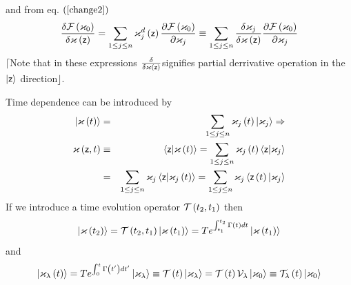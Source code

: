 and from eq. $\left( \ref{change2}\right) $%
\begin{equation}
\frac{\delta {\cal F}\left( \varkappa _{0}\right) }{\delta \varkappa \left( 
{\sf z}\right) }=\sum_{1\leq j\leq n}\varkappa _{j}^{d}\left( {\sf z}\right) 
\frac{\partial {\cal F}\left( \varkappa _{0}\right) }{\partial \varkappa _{j}%
}\equiv \sum_{1\leq j\leq n}\frac{\delta \varkappa _{j}}{\delta \varkappa
\left( {\sf z}\right) }\frac{\partial {\cal F}\left( \varkappa _{0}\right) }{%
\partial \varkappa _{j}}
\end{equation}%
$\lceil $Note that in these expressions $\frac{\delta }{\delta \varkappa
\left( {\sf z}\right) }$signifies partial derrivative operation in the $%
\left| {\sf z}\right\rangle $ direction$\rfloor $.

Time dependence can be introduced by 
\begin{eqnarray}
\left| {\bf \varkappa }\left( t\right) \right\rangle &=&\sum_{1\leq j\leq
n}\varkappa _{j}\left( t\right) \left| {\bf \varkappa }_{j}\right\rangle
\Rightarrow \\
\varkappa \left( {\sf z},t\right) &\equiv &\left\langle {\sf z}|{\bf %
\varkappa }\left( t\right) \right\rangle =\sum_{1\leq j\leq n}\varkappa
_{j}\left( t\right) \left\langle {\sf z}|{\bf \varkappa }_{j}\right\rangle \\
&=&\sum_{1\leq j\leq n}\varkappa _{j}\left\langle {\sf z}|{\bf \varkappa }%
_{j}\left( t\right) \right\rangle =\sum_{1\leq j\leq n}\varkappa
_{j}\left\langle {\sf z}\left( t\right) |{\bf \varkappa }_{j}\right\rangle
\end{eqnarray}%
If we introduce a time evolution operator ${\cal T}\left( t_{2},t_{1}\right) 
$ then%
\begin{equation}
\left| {\bf \varkappa }\left( t_{2}\right) \right\rangle ={\cal T}\left(
t_{2},t_{1}\right) \left| {\bf \varkappa }\left( t_{1}\right) \right\rangle
=Te^{\int_{t_{1}}^{t_{2}}\Gamma \left( t\right) dt}\left| {\bf \varkappa }%
\left( t_{1}\right) \right\rangle
\end{equation}%
and 
\begin{equation}
\left| {\bf \varkappa }_{\lambda }\left( t\right) \right\rangle
=Te^{\int_{0}^{t}\Gamma \left( t^{\prime }\right) dt^{\prime }}\left| {\bf %
\varkappa }_{\lambda }\right\rangle \equiv {\cal T}\left( t\right) \left| 
{\bf \varkappa }_{\lambda }\right\rangle ={\cal T}\left( t\right) {\cal V}%
_{\lambda }\left| {\bf \varkappa }_{0}\right\rangle \equiv {\cal T}_{\lambda
}\left( t\right) \left| {\bf \varkappa }_{0}\right\rangle
\end{equation}%
